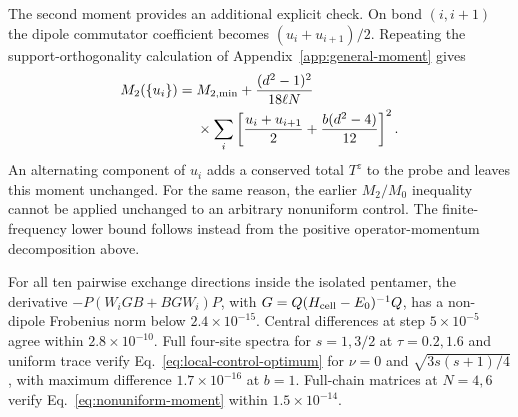 The second moment provides an additional explicit check. On bond
$(i,i+1)$ the dipole commutator coefficient becomes
$(u_i+u_{i+1})/2$. Repeating the support-orthogonality calculation of
Appendix~\ref{app:general-moment} gives
\begin{align}
 M_2(\{u_i\})={}&M_{2,\min}+\frac{(d^2-1)^2}{18\ell N}\notag\\
 &\times\sum_i\left[\frac{u_i+u_{i+1}}2+
              \frac{b(d^2-4)}{12}\right]^2.
 \label{eq:nonuniform-moment}
\end{align}
An alternating component of $u_i$ adds a conserved total $T^z$ to the
probe and leaves this moment unchanged. For the same reason, the earlier
$M_2/M_0$ inequality cannot be applied unchanged to an arbitrary
nonuniform control. The finite-frequency lower bound follows instead
from the positive operator-momentum decomposition above.

For all ten pairwise exchange directions inside the isolated pentamer,
the derivative $-P(W_iGB+BGW_i)P$, with
$G=Q(H_{\rm cell}-E_0)^{-1}Q$, has a non-dipole Frobenius norm below
$2.4\times10^{-15}$. Central differences at step $5\times10^{-5}$
agree within $2.8\times10^{-10}$. Full four-site spectra for $s=1,3/2$
at $\tau=0.2,1.6$ and uniform trace verify
Eq.~\eqref{eq:local-control-optimum} for $\nu=0$ and
$\sqrt{3s(s+1)/4}$, with maximum difference $1.7\times10^{-16}$ at
$b=1$. Full-chain matrices at $N=4,6$ verify
Eq.~\eqref{eq:nonuniform-moment} within $1.5\times10^{-14}$.
